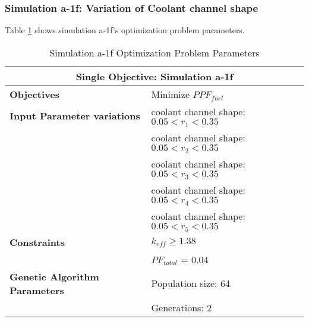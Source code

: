 \subsubsection{Simulation a-1f: Variation of Coolant channel shape}
Table \ref{tab:simulationa1f} shows simulation a-1f's optimization problem parameters. 
\begin{table}[htbp!]
    \centering
    \onehalfspacing
    \caption{Simulation a-1f Optimization Problem Parameters}
	\label{tab:simulationa1f}
    \footnotesize
    \begin{tabular}{l|p{6cm}}
    \hline 
    \multicolumn{2}{c}{\textbf{Single Objective: Simulation a-1f}} \\
    \hline 
    \textbf{Objectives} & Minimize $PPF_{fuel}$ \\
    \hline 
    \textbf{Input Parameter variations} 
    & coolant channel shape: $0.05<r_{1}<0.35$ \\
    & coolant channel shape: $0.05<r_{2}<0.35$ \\
    & coolant channel shape: $0.05<r_{3}<0.35$ \\
    & coolant channel shape: $0.05<r_{4}<0.35$ \\
    & coolant channel shape: $0.05<r_{5}<0.35$ \\
    \hline
    \textbf{Constraints} & $k_{eff} \geq 1.38$\\ 
    & $PF_{total}$ = 0.04 \\
    \hline 
    \textbf{Genetic Algorithm Parameters} & Population size: 64 \\
    & Generations: 2 \\
    \hline
    \end{tabular}
\end{table}

